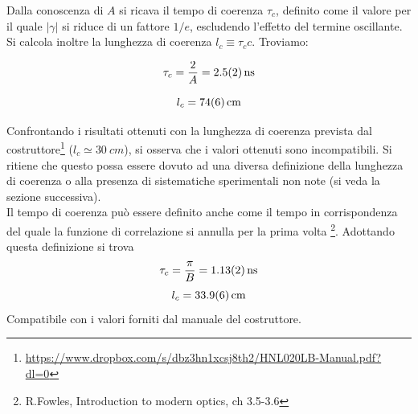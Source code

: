 \documentclass[10pt,oneside,a4paper]{article}
\begin{document}
\begin{multicols}{2}
Dalla conoscenza di $A$ si ricava il tempo di coerenza $\tau_c$, definito come il valore per il quale $\vert\gamma\vert$ si riduce di un fattore $1/e$, escludendo l'effetto del termine oscillante. Si calcola inoltre la lunghezza di coerenza $l_c \equiv \tau_c c$. Troviamo:

$$\tau_c = \frac{2}{A} = \SI{2.5 \pm 0.2}{\ns}$$

$$l_c = \SI{74 \pm 6}{cm}$$

Confrontando i risultati ottenuti con la lunghezza di coerenza prevista dal costruttore\footnote{\url{https://www.dropbox.com/s/dbz3hn1xcsj8th2/HNL020LB-Manual.pdf?dl=0}} ($l_c \simeq \SI{30}{cm}$), si osserva che i valori ottenuti sono incompatibili. Si ritiene che questo possa essere dovuto ad una diversa definizione della lunghezza di coerenza o alla presenza di sistematiche sperimentali non note (si veda la sezione successiva).\\
Il tempo di coerenza può essere definito anche come il tempo in corrispondenza del quale la funzione di correlazione si annulla per la prima volta \footnote{R.Fowles, Introduction to modern optics, ch 3.5-3.6}. Adottando questa definizione si trova
$$\tau_c = \frac{\pi}{B} = \SI{1.13 \pm 0.02}{ns}$$
$$l_c = \SI{33.9 \pm 0.6}{cm}$$
Compatibile con i valori forniti dal manuale del costruttore.



\end{multicols}
\end{document}
